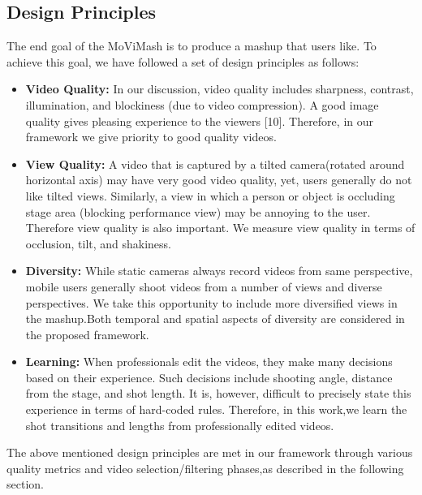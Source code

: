 \documentclass{sig-alternate}
\begin{document}
\subsection{Design Principles}
The end goal of the MoViMash is to produce a mashup that users like. To achieve this goal, we have followed a set of design principles as follows:
\begin{itemize}
\item \textbf{Video Quality:} In our discussion, video quality includes sharpness, contrast, illumination, and blockiness (due to video compression). A good image quality gives pleasing experience to the viewers [10]. Therefore, in our framework we give priority to good quality videos.
\item \textbf{View Quality:} A video that is captured by a tilted camera(rotated around horizontal axis) may have very good video quality, yet, users generally do not like tilted views. Similarly, a view in which a person or object is occluding stage area (blocking performance view) may be annoying to the user. Therefore view quality is also important. We measure view quality in terms of occlusion, tilt, and shakiness.
\item \textbf{Diversity:} While static cameras always record videos from same perspective, mobile users generally shoot videos from a number of views and diverse perspectives. We take this opportunity to include more diversified views in the mashup.Both temporal and spatial aspects of diversity are considered in the proposed framework.  
\item \textbf{Learning:} When professionals edit the videos, they make many decisions based on their experience. Such decisions include shooting angle, distance from the stage, and shot length. It is, however, difficult to precisely state this experience in terms of hard-coded rules. Therefore, in this work,we learn the shot transitions and lengths from professionally edited videos.  
\end{itemize}
The above mentioned design principles are met in our framework through various quality metrics and video selection/filtering phases,as described in the following section.
\end{document}
